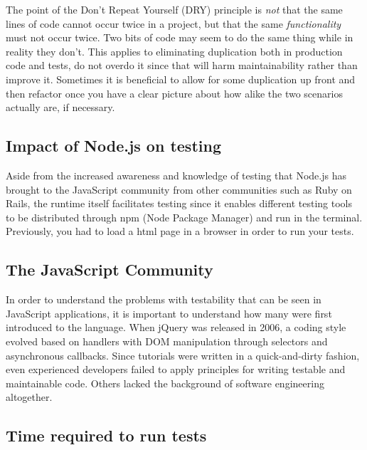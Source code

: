 \documentclass[11pt]{article}
\begin{document}
The point of the Don't Repeat Yourself (DRY) principle is \emph{not} that the same lines of code cannot occur twice in a project, but that the same \emph{functionality} must not occur twice. Two bits of code may seem to do the same thing while in reality they don't. This applies to eliminating duplication both in production code and tests, do not overdo it since that will harm maintainability rather than improve it. Sometimes it is beneficial to allow for some duplication up front and then refactor once you have a clear picture about how alike the two scenarios actually are, if necessary. \cite[questions~69-70]{Edelstam}

\subsection{Impact of Node.js on testing}

Aside from the increased awareness and knowledge of testing that Node.js has brought to the JavaScript community from other communities such as Ruby on Rails, the runtime itself facilitates testing since it enables different testing tools to be distributed through npm (Node Package Manager) and run in the terminal. Previously, you had to load a html page in a browser in order to run your tests. \cite[question~9]{Stenmark}

\subsection{The JavaScript Community}

In order to understand the problems with testability that can be seen in JavaScript applications, it is important to understand how many were first introduced to the language. When jQuery was released in 2006, a coding style evolved based on handlers with DOM manipulation through selectors and asynchronous callbacks. Since tutorials were written in a quick-and-dirty fashion, even experienced developers failed to apply principles for writing testable and maintainable code. Others lacked the background of software engineering altogether. \cite[question~10]{Stenmark}

\subsection{Time required to run tests}
\end{document}
